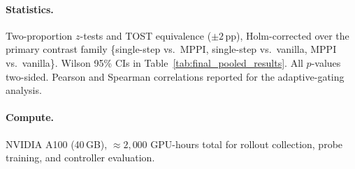 \paragraph{Statistics.} Two-proportion $z$-tests and TOST equivalence (${\pm}2$\,pp), Holm-corrected over the primary contrast family \{single-step vs.\ MPPI, single-step vs.\ vanilla, MPPI vs.\ vanilla\}. Wilson 95\% CIs in Table~\ref{tab:final_pooled_results}. All $p$-values two-sided. Pearson and Spearman correlations reported for the adaptive-gating analysis.

\paragraph{Compute.} NVIDIA A100 (40\,GB), ${\approx}2{,}000$ GPU-hours total for rollout collection, probe training, and controller evaluation.
